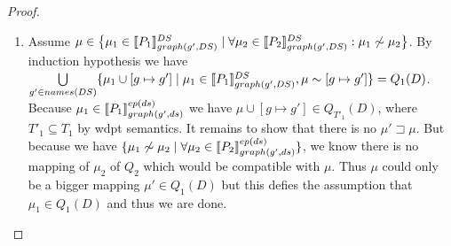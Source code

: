 \begin{proof}
\begin{enumerate}
\begin{enumerate}
				\item Assume $\mu \in \big\{ \mu_1 \in  \llbracket P_1 \rrbracket^{DS}_{graph(g',DS)} \mid 
					\forall \mu_2 \in \llbracket P_2 \rrbracket^{DS}_{graph(g',DS)}: \mu_1 \not\sim \mu_2 \big\}$. 
					By induction hypothesis we have \\
					$\bigcup\limits_{g' \in names(DS)} 
					\{ \mu_1 \cup [g \mapsto g'] \mid \mu_1 \in
						\llbracket P_1\rrbracket^{DS}_{graph(g',DS)}, \mu \sim
					[g\mapsto g'] \}  = Q_1(D)$.
					Because $\mu_1 \in \llbracket P_1
					\rrbracket^{ep(ds)}_{graph(g',ds)}$ 
					we have $\mu\cup [g \mapsto g'] \in Q_{T'_1}(D)$, where
					$T'_1 \subseteq T_1$ by wdpt semantics.
					It remains to show that there
					is no $\mu' \sqsupset \mu$. But because we have $\{\mu_1 \not\sim \mu_2 \mid
					\forall \mu_2 \in \llbracket P_2 \rrbracket^{ep(ds)}_{graph(g',ds)} \}$, 
					we know there is no mapping
					of $\mu_2$ of $Q_2$ which would be compatible with $\mu$. Thus $\mu$ could
					only be a bigger mapping $\mu' \in Q_1(D)$ but this defies the
					assumption that $\mu_1 \in Q_1(D)$ and thus we are done.
			\end{enumerate}


\end{enumerate}
\end{proof}
